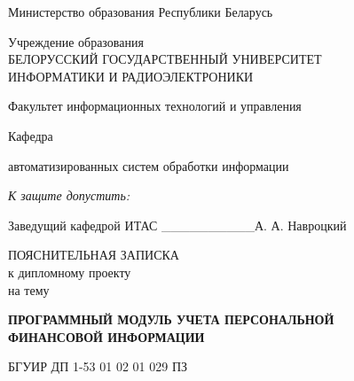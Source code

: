 \thispagestyle{empty}
\setlength{\parindent}{0ex} %

{\centering{}
  Министерство образования Республики Беларусь\par
}

\bigskip
{\centering{}
  Учреждение образования \\
  БЕЛОРУССКИЙ ГОСУДАРСТВЕННЫЙ УНИВЕРСИТЕТ \\
  ИНФОРМАТИКИ И РАДИОЭЛЕКТРОНИКИ\par
}

\bigskip
Факультет
информационных технологий и управления

\smallskip
\parbox{\widthof{Факультет}}{Кафедра}
автоматизированных систем обработки информации

\vspace{\baselineskip}
\hfill
\begin{minipage}{.4\textwidth}
  {\raggedright{}
    \textit{К защите допустить:}

    \smallskip
    Заведущий кафедрой ИТАС
    \_\_\_\_\_\_\_\_\_\_А. А. Навроцкий\par
  }
\end{minipage}

\vspace{2\baselineskip}

{\centering{}
  ПОЯСНИТЕЛЬНАЯ ЗАПИСКА \\
  к дипломному проекту \\
  на тему\par
}

\bigskip
{\centering{}
  \textbf{ПРОГРАММНЫЙ МОДУЛЬ УЧЕТА ПЕРСОНАЛЬНОЙ \\ ФИНАНСОВОЙ ИНФОРМАЦИИ}\par
}

\bigskip
{\centering{}
  БГУИР ДП 1-53 01 02 01 029 ПЗ\par
}

\vspace{\baselineskip}

